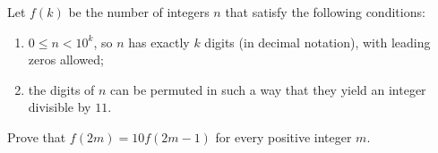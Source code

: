 Let $f(k)$ be the number of integers $n$ that satisfy the following conditions:
\begin{enumerate}
\item[(i)] $0 \leq n < 10^k$, so $n$ has exactly $k$ digits (in decimal notation), with leading zeros allowed;
\item[(ii)] the digits of $n$ can be permuted in such a way that they yield an integer divisible by $11$.
\end{enumerate}
Prove that $f(2m) = 10 f(2m - 1)$ for every positive integer $m$.
